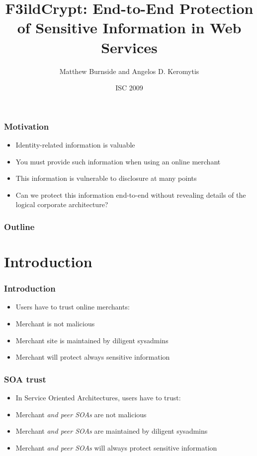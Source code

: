 \documentclass{beamer}
\title[F3ildCrypt]{F3ildCrypt: End-to-End Protection of Sensitive Information
in Web Services}
\author[Burnside, Keromytis]{Matthew Burnside and Angelos D. Keromytis}
\institute[Columbia University]{
Department of Computer Science\\
Columbia University\\
\texttt{\{mb, angelos\}@cs.columbia.edu}
}
\date{ISC 2009}
\begin{document}
\begin{frame}[plain]
    \titlepage
\end{frame}

\begin{frame}
\frametitle{Motivation}
\begin{itemize}
\item Identity-related information is valuable
\item You must provide such information when using an online merchant
\item This information is vulnerable to disclosure at many points
\item Can we protect this information end-to-end without revealing details of
the logical corporate architecture?
\end{itemize}
\end{frame}

\begin{frame}
\frametitle{Outline}
\tableofcontents
\end{frame}

\section{Introduction}

\begin{frame}
\frametitle{Introduction}
\begin{itemize}
\item Users have to trust online merchants:
\item Merchant is not malicious
\item Merchant site is maintained by diligent sysadmins
\item Merchant will protect always sensitive information
\end{itemize}
\end{frame}

\begin{frame}
\frametitle{SOA trust}
\begin{itemize}
\item In Service Oriented Architectures, users have to trust:
\item Merchant \emph{and peer SOAs} are not malicious
\item Merchant \emph{and peer SOAs} are maintained by diligent sysadmins
\item Merchant \emph{and peer SOAs} will always protect sensitive information
\end{itemize}
\end{frame}
\end{document}
